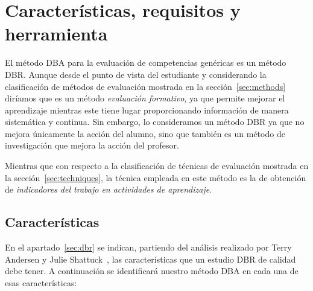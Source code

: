\section{Características, requisitos y herramienta}

El método DBA para la evaluación de competencias genéricas es un método DBR. Aunque desde el punto de vista del estudiante y considerando la clasificación de métodos de evaluación mostrada en la sección~\ref{sec:methods} diríamos que es un método \emph{evaluación formativo}, ya que permite mejorar el aprendizaje mientras este tiene lugar proporcionando información de manera sistemática y continua. Sin embargo, lo consideramos un método DBR ya que no mejora únicamente la acción del alumno, sino que también es un método de investigación que mejora la acción del profesor.

Mientras que con respecto a la clasificación de técnicas de evaluación mostrada en la sección~\ref{sec:techniques}, la técnica empleada en este método es la de obtención de \emph{indicadores del trabajo en actividades de aprendizaje}.

\subsection{Características}

En el apartado~\ref{sec:dbr} se indican, partiendo del análisis realizado por Terry Andersen y Julie Shattuck~\cite{anderson2012design}, las características que un estudio DBR de calidad debe tener. A continuación se identificará nuestro método DBA en cada una de esas características:

